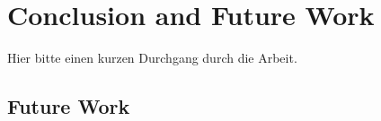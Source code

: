 \chapter{Conclusion and Future Work}
\label{chap:conclusion}
Hier bitte einen kurzen Durchgang durch die Arbeit.


\section*{Future Work}
\label{sec:futurework}

